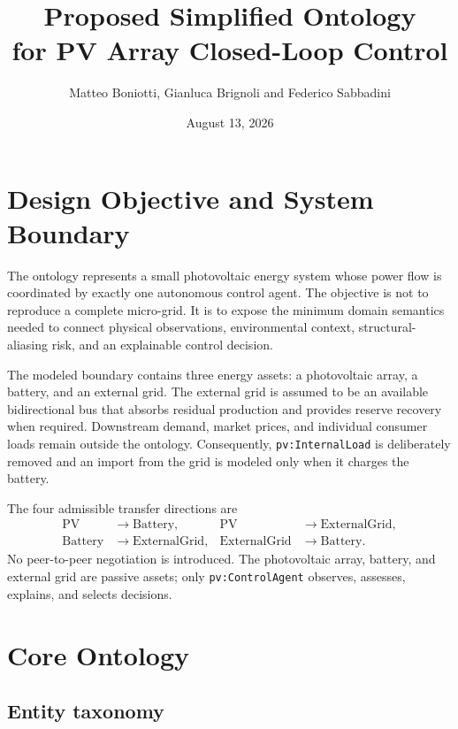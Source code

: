 \documentclass[
	letterpaper,
	10pt,
	unnumberedsections,
	twoside,
]{LTJournalArticle}
\title{Proposed Simplified Ontology\\for PV Array Closed-Loop Control}
\author{Matteo Boniotti, Gianluca Brignoli and Federico Sabbadini}
\date{August 13, 2026}
\newcommand{\pv}[1]{\texttt{pv:#1}}
\begin{document}
\maketitle

\section{Design Objective and System Boundary}

The ontology represents a small photovoltaic energy system whose power flow is coordinated by exactly one autonomous control agent. The objective is not to reproduce a complete micro-grid. It is to expose the minimum domain semantics needed to connect physical observations, environmental context, structural-aliasing risk, and an explainable control decision.

The modeled boundary contains three energy assets: a photovoltaic array, a battery, and an external grid. The external grid is assumed to be an available bidirectional bus that absorbs residual production and provides reserve recovery when required. Downstream demand, market prices, and individual consumer loads remain outside the ontology. Consequently,
\pv{InternalLoad} is deliberately removed and an import from the grid is modeled only when it charges the battery.

The four admissible transfer directions are
\begin{equation}
\begin{aligned}
\mathrm{PV} &\longrightarrow \mathrm{Battery}, &
\mathrm{PV} &\longrightarrow \mathrm{ExternalGrid},\\
\mathrm{Battery} &\longrightarrow \mathrm{ExternalGrid}, &
\mathrm{ExternalGrid} &\longrightarrow \mathrm{Battery}.
\end{aligned}
\label{eq:routes}
\end{equation}
No peer-to-peer negotiation is introduced. The photovoltaic array, battery, and external grid are passive assets; only \pv{ControlAgent} observes, assesses, explains, and selects decisions.

\section{Core Ontology}

\subsection{Entity taxonomy}
\end{document}
